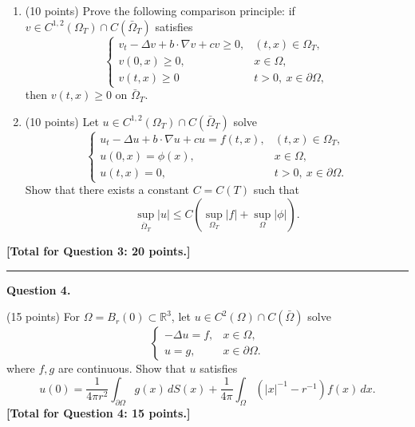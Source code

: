 \documentclass[11pt, a4paper]{article}
\begin{document}
\begin{enumerate}[label=(\alph*)]
    \item (10 points) Prove the following comparison principle: if $v \in C^{1,2}(\Omega_T) \cap C(\bar{\Omega}_T)$ satisfies
          \[
              \begin{cases}
                  v_t - \Delta v + b \cdot \nabla v + cv \ge 0, & (t, x) \in \Omega_T,            \\
                  v(0, x) \ge 0,                                & x \in \Omega,                   \\
                  v(t, x) \ge 0                                 & t > 0, \ x \in \partial \Omega,
              \end{cases}
          \]
          then $v(t, x) \ge 0$ on $\bar{\Omega}_T$.

    \item (10 points) Let $u \in C^{1,2}(\Omega_T) \cap C(\bar{\Omega}_T)$ solve
          \[
              \begin{cases}
                  u_t - \Delta u + b \cdot \nabla u + cu = f(t, x), & (t, x) \in \Omega_T,            \\
                  u(0, x) = \phi(x),                                & x \in \Omega,                   \\
                  u(t, x) = 0,                                      & t > 0, \ x \in \partial \Omega.
              \end{cases}
          \]
          Show that there exists a constant $C = C(T)$ such that
          \[
              \sup_{\bar{\Omega}_T} |u| \le C \left( \sup_{\Omega_T} |f| + \sup_{\Omega} |\phi| \right).
          \]
\end{enumerate}
\textbf{[Total for Question 3: 20 points.]}

\noindent \rule[0.5pt]{\textwidth}{0.5pt}

\textbf{Question 4.}

(15 points) For $\Omega = B_r(0) \subset \mathbb{R}^3$, let $u \in C^2(\Omega) \cap C(\bar{\Omega})$ solve
\[
    \begin{cases}
        -\Delta u = f, & x \in \Omega,          \\
        u = g,         & x \in \partial \Omega.
    \end{cases}
\]
where $f, g$ are continuous. Show that $u$ satisfies
\[
    u(0) = \frac{1}{4\pi r^2} \int_{\partial \Omega} g(x) \, dS(x) + \frac{1}{4\pi} \int_{\Omega} (|x|^{-1} - r^{-1}) f(x) \, dx.
\]
\textbf{[Total for Question 4: 15 points.]}
\end{document}
